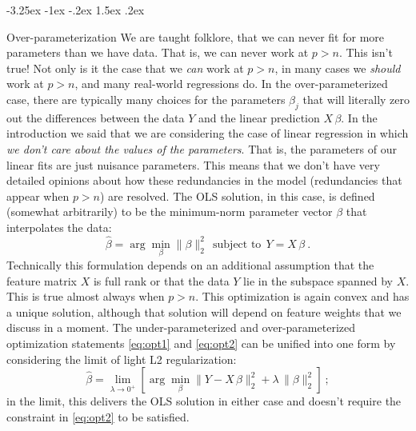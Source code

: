 \documentclass[12pt,letterpaper]{article}
\makeatletter
\renewcommand\section{\@startsection {section}{1}{\z@}%
  {-3.25ex \@plus -1ex \@minus -.2ex}%
  {1.5ex \@plus .2ex}%
  {\raggedright\normalfont\large\bfseries}}
\newcommand{\sectionname}{Section}
\makeatother
\begin{document}
\section{Over-parameterization}\label{sec:overpar}
We are taught folklore, that we can never fit for more parameters than we have data. That is, we can never work at $p>n$.
This isn't true!
Not only is it the case that we \emph{can} work at $p>n$, in many cases we \emph{should} work at $p>n$, and many real-world regressions do.
In the over-parameterized case, there are typically many choices for the parameters $\beta_j$ that will literally zero out the differences between the data $Y$ and the linear prediction $X\,\beta$.
In the introduction we said that we are considering the case of linear regression in which \emph{we don't care about the values of the parameters}.
That is, the parameters of our linear fits are just nuisance parameters.
This means that we don't have very detailed opinions about how these redundancies in the model (redundancies that appear when $p>n$) are resolved.
The OLS solution, in this case, is defined (somewhat arbitrarily) to be the minimum-norm parameter vector $\beta$ that interpolates the data:
\begin{equation}\label{eq:opt2}
    \hat{\beta} = \arg\min_\beta \|\beta\|_2^2 ~~\mbox{subject to}~~ Y = X\,\beta
    ~.
\end{equation}
Technically this formulation depends on an additional assumption that the feature matrix $X$ is full rank or that the data $Y$ lie in the subspace spanned by $X$.
This is true almost always when $p>n$.
This optimization is again convex and has a unique solution, although that solution will depend on feature weights that we discuss in a moment.
The under-parameterized and over-parameterized optimization statements \eqref{eq:opt1} and \eqref{eq:opt2} can be unified into one form by considering the limit of light L2 regularization:
\begin{equation}\label{eq:opt3}
    \hat{\beta} = \lim_{\lambda\to 0^+}\left[\arg\min_\beta \|Y - X\,\beta\|_2^2 + \lambda\,\|\beta\|_2^2\right]
    ~;
\end{equation}
in the limit, this delivers the OLS solution in either case and doesn't require the constraint in \eqref{eq:opt2} to be satisfied.
\end{document}
